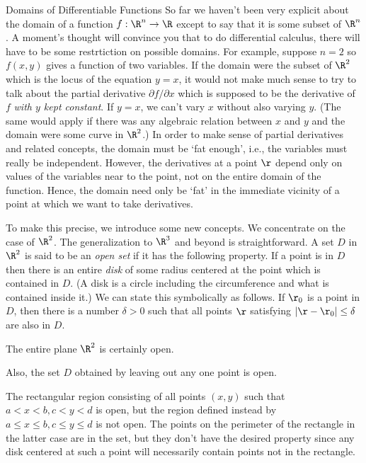 \subhead Domains of Differentiable Functions \endsubhead
So far we haven't been very explicit about the domain of
a function $f:\R^n \to \R$ except to say that it is some
subset of $\R^n$.   A moment's thought will convince you
that to  do differential
calculus, there will have to be some restrtiction
on possible domains.  For
example, suppose $n = 2$ so $f(x,y)$ gives a function of
two variables.  If the domain were the subset of $\R^2$
which is the locus of the equation $y = x$, it would not
make much sense to try to talk about the partial derivative
$\partial f/\partial x$ which is supposed to be the
derivative of $f$ {\it with $y$ kept constant}.   If
$y = x$, we can't vary $x$ without also varying $y$.
(The same would apply if there was any algebraic
relation between $x$ and $y$ and the domain were some
curve in $\R^2$.)
	In order to make sense of partial derivatives and
related concepts, the domain must be `fat enough', i.e.,
the variables must really be independent.
However, the derivatives at a point $\r$ depend only on values of the
variables near to the point, not on the entire domain of the
function.   Hence, the domain need only be `fat' in the
immediate vicinity of a point at which we want to take 
derivatives.

	To make this precise, we introduce some new
concepts.  We concentrate on the case of $\R^2$.   The
generalization to $\R^3$ and beyond is straightforward.
A set $D$ in $\R^2$ is said to be an {\it open set\/}
%
if it has the following property.   If a point is in
$D$ then there is an entire {\it disk\/} of some radius
%
centered at the point which is contained in $D$.  (A
disk is a circle including the circumference and what is
contained inside it.)  We can state this symbolically as
follows.   If $\r_0$ is a point in $D$, then there is
a number $\delta > 0$ such that all points $\r$
satisfying $|\r - \r_0| \le \delta$ are also in $D$.
	
  The entire plane $\R^2$ is certainly
open.  

Also, the set $D$ obtained by leaving out any
one point is open.

The rectangular region consisting of all points $(x,y)$
such that  $a < x < b, c < y < d$ is open, but the
region defined instead by
$a \le x \le b, c\le y \le d$ is not open.   The points
on the perimeter of the rectangle in the latter case
are in the set, but they don't have the desired property
since any disk centered at such a point will necessarily
contain points not in the rectangle.

